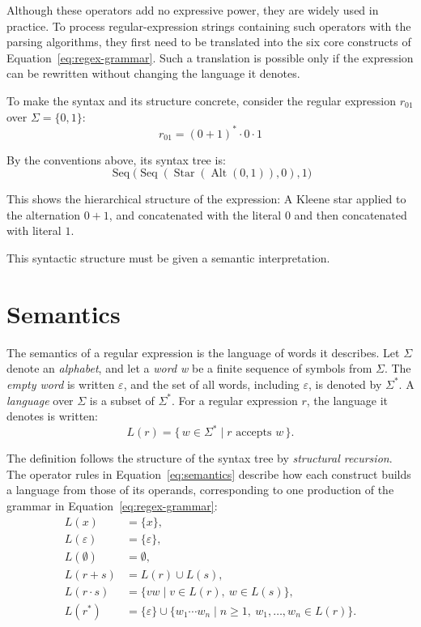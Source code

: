 Although these operators add no expressive power,
they are widely used in practice.
To process regular-expression strings containing such operators
with the parsing algorithms,
they first need to be translated into the six core
constructs of Equation~\eqref{eq:regex-grammar}.
Such a translation is possible only if the
expression can be rewritten without changing
the language it denotes.

To make the syntax and its structure concrete, consider the
regular expression $r_{01}$ over $\Sigma=\{0,1\}$:
\begin{equation}
r_{01} = (0+1)^* \cdot 0 \cdot 1
\label{eq:r01}
\end{equation}

By the conventions above, its syntax tree is:
\begin{equation}\label{eq:r01-tree}
\operatorname{Seq}\bigl(
    \operatorname{Seq}(
        \operatorname{Star}(\operatorname{Alt}(0,1)),
        0
    ),
    1
\bigr)
\end{equation}

This shows the hierarchical structure of the expression: 
A Kleene star applied to the alternation $0+1$,
and concatenated with the literal $0$ and then concatenated with literal $1$.

This syntactic structure must be given a semantic interpretation.

%
%
%

\clearpage
\section{Semantics}
\label{sec:regex-semantics}

The semantics of a regular expression is the language of words it describes. 
Let $\Sigma$ denote an \emph{alphabet}, 
and let a \emph{word w} be a finite sequence of symbols from $\Sigma$. 
The \emph{empty word} is written $\varepsilon$, 
and the set of all words, including $\varepsilon$, 
is denoted by $\Sigma^*$. 
A \emph{language} over $\Sigma$ is a subset of $\Sigma^*$. 
For a regular expression $r$, the language it denotes is written:
\[
L(r) = \{\, w \in \Sigma^* \mid r \text{ accepts } w \,\}.
\]


The definition follows the structure of the syntax tree by \emph{structural recursion}. 
The operator rules in Equation~\eqref{eq:semantics}
describe how each construct builds a language from those of its operands,
corresponding to one production of the grammar in Equation~\eqref{eq:regex-grammar}:
\begin{equation}\label{eq:semantics}
\begin{aligned}
L(x) &= \{x\}, \\
L(\varepsilon) &= \{\varepsilon\}, \\
L(\emptyset) &= \emptyset, \\
L(r+s) &= L(r)\cup L(s), \\
L(r\cdot s) &= \{vw \mid v\in L(r),\ w\in L(s)\}, \\
L(r^*) &= \{\varepsilon\}
          \cup
          \{w_1\cdots w_n
            \mid n\geq 1,\ w_1,\ldots,w_n\in L(r)\}.
\end{aligned}
\end{equation}

